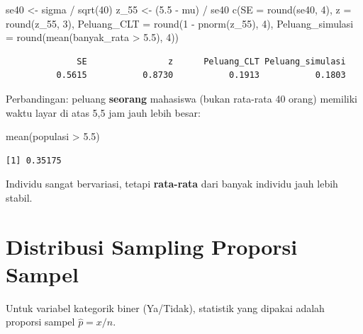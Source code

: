 \documentclass[
  indonesian,
  letterpaper,
]{book}
\newenvironment{Shaded}{\begin{snugshade}}{\end{snugshade}}
\newcommand{\AttributeTok}[1]{\textcolor[rgb]{0.40,0.45,0.13}{#1}}
\newcommand{\DecValTok}[1]{\textcolor[rgb]{0.68,0.00,0.00}{#1}}
\newcommand{\FloatTok}[1]{\textcolor[rgb]{0.68,0.00,0.00}{#1}}
\newcommand{\FunctionTok}[1]{\textcolor[rgb]{0.28,0.35,0.67}{#1}}
\newcommand{\NormalTok}[1]{\textcolor[rgb]{0.00,0.23,0.31}{#1}}
\newcommand{\OtherTok}[1]{\textcolor[rgb]{0.00,0.23,0.31}{#1}}
\newcommand{\SpecialCharTok}[1]{\textcolor[rgb]{0.37,0.37,0.37}{#1}}
\begin{document}
\begin{Shaded}
\begin{Highlighting}[]
\NormalTok{se40 }\OtherTok{\textless{}{-}}\NormalTok{ sigma }\SpecialCharTok{/} \FunctionTok{sqrt}\NormalTok{(}\DecValTok{40}\NormalTok{)}
\NormalTok{z\_55 }\OtherTok{\textless{}{-}}\NormalTok{ (}\FloatTok{5.5} \SpecialCharTok{{-}}\NormalTok{ mu) }\SpecialCharTok{/}\NormalTok{ se40}
\FunctionTok{c}\NormalTok{(}\AttributeTok{SE =} \FunctionTok{round}\NormalTok{(se40, }\DecValTok{4}\NormalTok{), }\AttributeTok{z =} \FunctionTok{round}\NormalTok{(z\_55, }\DecValTok{3}\NormalTok{),}
  \AttributeTok{Peluang\_CLT =} \FunctionTok{round}\NormalTok{(}\DecValTok{1} \SpecialCharTok{{-}} \FunctionTok{pnorm}\NormalTok{(z\_55), }\DecValTok{4}\NormalTok{),}
  \AttributeTok{Peluang\_simulasi =} \FunctionTok{round}\NormalTok{(}\FunctionTok{mean}\NormalTok{(banyak\_rata }\SpecialCharTok{\textgreater{}} \FloatTok{5.5}\NormalTok{), }\DecValTok{4}\NormalTok{))}
\end{Highlighting}
\end{Shaded}

\begin{verbatim}
              SE                z      Peluang_CLT Peluang_simulasi 
          0.5615           0.8730           0.1913           0.1803 
\end{verbatim}

Perbandingan: peluang \textbf{seorang} mahasiswa (bukan rata-rata 40
orang) memiliki waktu layar di atas 5,5 jam jauh lebih besar:

\begin{Shaded}
\begin{Highlighting}[]
\FunctionTok{mean}\NormalTok{(populasi }\SpecialCharTok{\textgreater{}} \FloatTok{5.5}\NormalTok{)}
\end{Highlighting}
\end{Shaded}

\begin{verbatim}
[1] 0.35175
\end{verbatim}

Individu sangat bervariasi, tetapi \textbf{rata-rata} dari banyak
individu jauh lebih stabil.

\section{Distribusi Sampling Proporsi
Sampel}\label{distribusi-sampling-proporsi-sampel}

Untuk variabel kategorik biner (Ya/Tidak), statistik yang dipakai adalah
proporsi sampel \(\hat{p} = x/n\).
\end{document}
